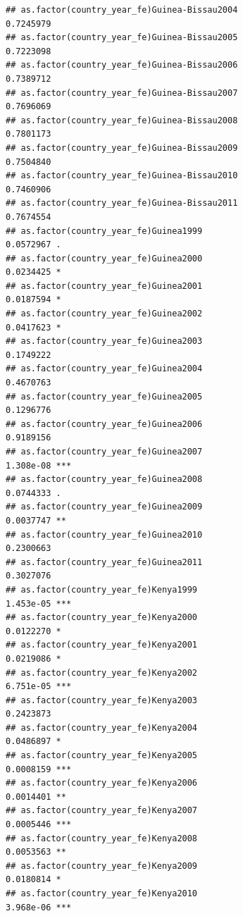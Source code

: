 \documentclass[
  a4paper,
]{article}
\begin{document}
\begin{verbatim}
## as.factor(country_year_fe)Guinea-Bissau2004                    0.7245979    
## as.factor(country_year_fe)Guinea-Bissau2005                    0.7223098    
## as.factor(country_year_fe)Guinea-Bissau2006                    0.7389712    
## as.factor(country_year_fe)Guinea-Bissau2007                    0.7696069    
## as.factor(country_year_fe)Guinea-Bissau2008                    0.7801173    
## as.factor(country_year_fe)Guinea-Bissau2009                    0.7504840    
## as.factor(country_year_fe)Guinea-Bissau2010                    0.7460906    
## as.factor(country_year_fe)Guinea-Bissau2011                    0.7674554    
## as.factor(country_year_fe)Guinea1999                           0.0572967 .  
## as.factor(country_year_fe)Guinea2000                           0.0234425 *  
## as.factor(country_year_fe)Guinea2001                           0.0187594 *  
## as.factor(country_year_fe)Guinea2002                           0.0417623 *  
## as.factor(country_year_fe)Guinea2003                           0.1749222    
## as.factor(country_year_fe)Guinea2004                           0.4670763    
## as.factor(country_year_fe)Guinea2005                           0.1296776    
## as.factor(country_year_fe)Guinea2006                           0.9189156    
## as.factor(country_year_fe)Guinea2007                           1.308e-08 ***
## as.factor(country_year_fe)Guinea2008                           0.0744333 .  
## as.factor(country_year_fe)Guinea2009                           0.0037747 ** 
## as.factor(country_year_fe)Guinea2010                           0.2300663    
## as.factor(country_year_fe)Guinea2011                           0.3027076    
## as.factor(country_year_fe)Kenya1999                            1.453e-05 ***
## as.factor(country_year_fe)Kenya2000                            0.0122270 *  
## as.factor(country_year_fe)Kenya2001                            0.0219086 *  
## as.factor(country_year_fe)Kenya2002                            6.751e-05 ***
## as.factor(country_year_fe)Kenya2003                            0.2423873    
## as.factor(country_year_fe)Kenya2004                            0.0486897 *  
## as.factor(country_year_fe)Kenya2005                            0.0008159 ***
## as.factor(country_year_fe)Kenya2006                            0.0014401 ** 
## as.factor(country_year_fe)Kenya2007                            0.0005446 ***
## as.factor(country_year_fe)Kenya2008                            0.0053563 ** 
## as.factor(country_year_fe)Kenya2009                            0.0180814 *  
## as.factor(country_year_fe)Kenya2010                            3.968e-06 ***

\end{verbatim}
\end{document}
